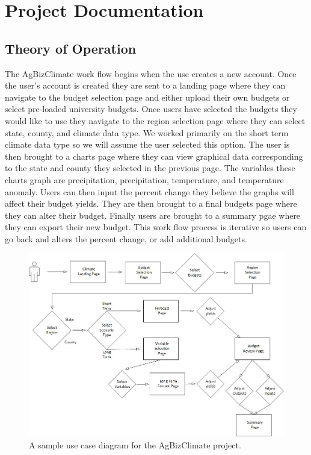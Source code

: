 \documentclass[onecolumn, draftclsnofoot,10pt, compsoc]{article}
\begin{document}
\section{Project Documentation}
    \subsection{Theory of Operation}
    The AgBizClimate work flow begins when the use creates a new account. Once the user's account is created they are sent to a landing page where they can navigate to the budget selection page and either upload their own budgets or select pre-loaded university budgets. Once users have selected the budgets they would like to use they navigate to the region selection page where they can select state, county, and climate data type. We worked primarily on the short term climate data type so we will assume the user selected this option. The user is then brought to a charts page where they can view graphical data corresponding to the state and county they selected in the previous page. The variables these charts graph are precipitation, precipitation, temperature, and temperature anomaly. Users can then input the percent change they believe the graphs will affect their budget yields. They are then brought to a final budgets page where they can alter their budget. Finally users are brought to a summary pgae where they can export their new budget. This work flow process is iterative so users can go back and alters the percent change, or add additional budgets.
        \begin{figure}[h!]
            \includegraphics[width=17cm]{./Images/workflowDiagram.jpg}
            \caption{A sample use case diagram for the AgBizClimate project.}
        \end{figure}
    
\end{document}
